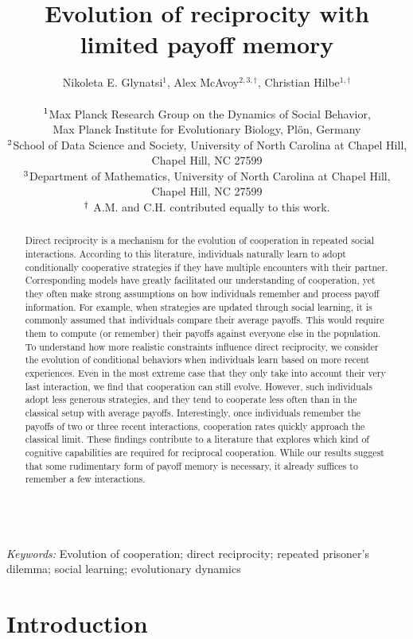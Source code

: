 \documentclass[11pt]{article}
\title{\bf  \sffamily \Large Evolution of reciprocity %
with limited payoff memory\\}
\date{}
\author{\parbox[c]{16cm}{\centering \onehalfspacing 
Nikoleta E. Glynatsi$^1$,  Alex McAvoy$^{2,3, \dagger}$, Christian Hilbe$^{1, \dagger}$\\ \quad \\
$^{\rm 1}$Max Planck Research Group on the Dynamics of Social Behavior,\\ Max Planck Institute for Evolutionary Biology, Pl\"{o}n, Germany \\
$^{\rm 2}$School of Data Science and Society, University of North Carolina at Chapel Hill,\\ Chapel Hill, NC 27599 \\
$^{\rm 3}$Department of Mathematics, University of North Carolina at Chapel Hill,\\ Chapel Hill, NC 27599 \\
$^{\rm \dagger}$ A.M. and C.H. contributed equally to this work.}}
\theoremstyle{plainCl1}
\theoremstyle{plainCl2}
\begin{document}
\maketitle


\begin{abstract}
\noindent
Direct reciprocity is a mechanism for the evolution of cooperation in repeated social interactions.
According to this literature, individuals naturally learn to adopt conditionally cooperative strategies if they have multiple encounters with their partner.
Corresponding models have greatly facilitated our understanding of cooperation, yet they often make strong assumptions on how individuals remember and process payoff information.
For example, when strategies are updated through social learning, it is commonly assumed that individuals compare their average payoffs.
This would require them to compute (or remember) their payoffs against everyone else in the population.
To understand how more realistic constraints influence direct reciprocity, we consider the evolution of conditional behaviors when individuals learn based on more recent experiences.
Even in the most extreme case that they only take into account their very last interaction, we find that cooperation can still evolve.
However, such individuals adopt less generous strategies, and they tend to cooperate less often than in the classical setup with average payoffs.
Interestingly, once individuals remember the payoffs of two or three recent interactions, cooperation rates quickly approach the classical limit.
These findings contribute to a literature that explores which kind of cognitive capabilities are required for reciprocal cooperation.
While our results suggest that some rudimentary form of payoff memory is necessary, it already suffices to remember a few interactions.
\end{abstract}



~\\
{\it Keywords:} Evolution of cooperation; direct reciprocity; repeated prisoner's dilemma; social learning; evolutionary dynamics



\clearpage
\newpage



\section{Introduction}

\end{document}
